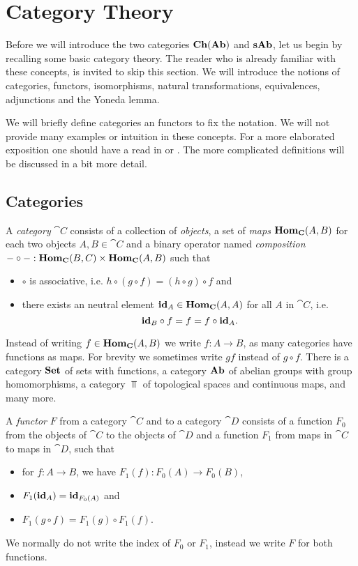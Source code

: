 \section{Category Theory}
\label{sec:Category Theory}
Before we will introduce the two categories $\mathbf{Ch}(\mathbf{Ab})$ and $\mathbf{sAb}$, let us begin by recalling some basic category theory. The reader who is already familiar with these concepts, is invited to skip this section. We will introduce the notions of categories, functors, isomorphisms, natural transformations, equivalences, adjunctions and the Yoneda lemma.

We will briefly define categories an functors to fix the notation. We will not provide many examples or intuition in these concepts. For a more elaborated exposition one should have a read in \cite{awodey} or \cite{maclane}. The more complicated definitions will be discussed in a bit more detail.

\subsection{Categories}
\begin{definition}
	A \emph{category} $\cat{C}$ consists of a collection of \emph{objects}, a set of \emph{maps} $\mathbf{Hom}_{\mathbf{C}}(A, B)$ for each two objects $A, B \in \cat{C}$ and a binary operator named \emph{composition} $-\circ-:\mathbf{Hom}_{\mathbf{C}}(B, C) \times \mathbf{Hom}_{\mathbf{C}}(A, B)$ such that
	\begin{itemize}
		\item $\circ$ is associative, i.e. $h \circ (g \circ f) = (h \circ g) \circ f$ and
		\item there exists an neutral element $\mathbf{id}_A \in \mathbf{Hom}_{\mathbf{C}}(A, A)$ for all $A$ in $\cat{C}$, i.e.
		$$ \mathbf{id}_B \circ f = f = f \circ \mathbf{id}_A. $$
	\end{itemize}
\end{definition}

Instead of writing $f \in \mathbf{Hom}_{\mathbf{C}}(A, B)$ we write $f: A \to B$, as many categories have functions as maps. For brevity we sometimes write $gf$ instead of $g \circ f$. There is a category $\mathbf{Set}$ of sets with functions, a category $\mathbf{Ab}$ of abelian groups with group homomorphisms, a category $\Top$ of topological spaces and continuous maps, and many more.

\begin{definition}
	A \emph{functor} $F$ from a category $\cat{C}$ and to a category $\cat{D}$ consists of a function $F_0$ from the objects of $\cat{C}$ to the objects of $\cat{D}$ and a function $F_1$ from maps in $\cat{C}$ to maps in $\cat{D}$, such that
	\begin{itemize}
		\item for $f: A \to B$, we have $F_1(f): F_0(A) \to F_0(B)$,
		\item $F_1(\mathbf{id}_A) = \mathbf{id}_{F_0(A)}$ and
		\item $F_1(g \circ f) = F_1(g) \circ F_1(f)$.
	\end{itemize}
	We normally do not write the index of $F_0$ or $F_1$, instead we write $F$ for both functions.
\end{definition}

